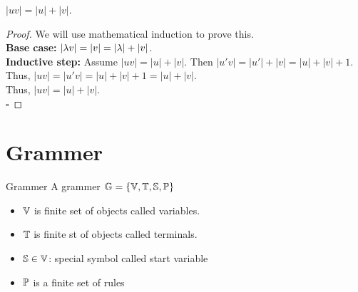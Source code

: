 	\begin{theorem}{}
		$\left| uv \right| = \left| u \right| + \left| v \right|$.
	\end{theorem}

	\begin{proof}
		We will use mathematical induction to prove this. \\
		\textbf{Base case:} $\left| \lambda v \right| = \left| v \right| = \left| \lambda \right| + \left| v \right|$. \\
		\textbf{Inductive step:} Assume $\left| uv \right| = \left| u \right| + \left| v \right|$. Then $\left| u'v \right| = \left| u' \right| + \left| v \right| = \left| u \right| + \left| v \right| + 1$. \\
		Thus, $\left| uv \right| = \left| u'v \right| = \left| u \right| + \left| v \right| + 1 = \left| u \right| + \left| v \right|$. \\
		Thus, $\left| uv \right| = \left| u \right| + \left| v \right|$.
		\\ $\square$
	\end{proof}

	\section{Grammer}
	\begin{definition}{Grammer}
		A grammer $\mathbb{G} = \{\mathbb{V}, \mathbb{T}, \mathbb{S}, \mathbb{P}\}$ 
		\begin{itemize}
			\item $\mathbb{V}$ is finite set of objects called variables. 
			\item $\mathbb{T}$ is finite st of objects called terminals. 
			\item $\mathbb{S} \in \mathbb{V}$: special symbol called start variable 
			\item $\mathbb{P}$ is a finite set of rules 
		\end{itemize}
	\end{definition}	
